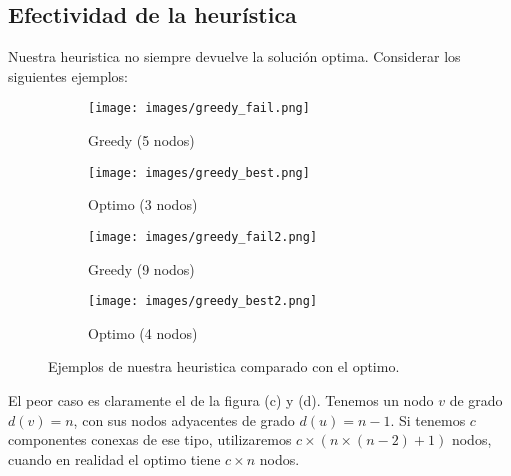 \subsection{Efectividad de la heurística}

Nuestra heuristica no siempre devuelve la solución optima. Considerar los siguientes ejemplos:

\begin{figure}[ht]
\centering
\begin{subfigure}[b]{0.4\textwidth}
	\texttt{[image: images/greedy\_fail.png]}
	\caption{Greedy (5 nodos)}
\end{subfigure}
\begin{subfigure}[b]{0.4\textwidth}
	\texttt{[image: images/greedy\_best.png]}
	\caption{Optimo (3 nodos)}
\end{subfigure}

\begin{subfigure}[b]{0.4\textwidth}
	\texttt{[image: images/greedy\_fail2.png]}
	\caption{Greedy (9 nodos)}
\end{subfigure}
\begin{subfigure}[b]{0.4\textwidth}
	\texttt{[image: images/greedy\_best2.png]}
	\caption{Optimo (4 nodos)}
\end{subfigure}
\caption{Ejemplos de nuestra heuristica comparado con el optimo.}
\end{figure}

El peor caso es claramente el de la figura (c) y (d). Tenemos un nodo $v$ de grado $d(v) = n$, con sus nodos adyacentes de grado $d(u) = n - 1$. Si tenemos $c$ componentes conexas de ese tipo, utilizaremos $c \times (n \times (n-2) + 1)$ nodos, cuando en realidad el optimo tiene $c \times n$ nodos.



